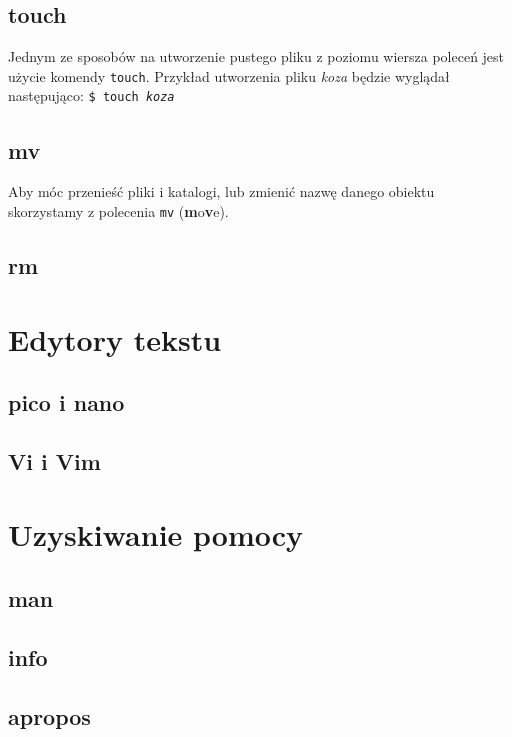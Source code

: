 \documentclass[10 pt, a4paper, draft]{article}
\begin{document}
\subsection{touch}
Jednym ze sposobów na utworzenie pustego pliku z poziomu wiersza poleceń jest użycie komendy \texttt{touch}. Przykład utworzenia pliku \textit{koza} będzie wyglądał następująco:
\newline
\texttt{\$ touch \textit{koza}}

\subsection{mv}
Aby móc przenieść pliki i katalogi, lub zmienić nazwę danego obiektu skorzystamy z polecenia \texttt{mv} (\textbf{m}o\textbf{v}e).

\subsection{rm}

\newpage
\section{Edytory tekstu}
\subsection{pico i nano}
\subsection{Vi i Vim}

\newpage
\section{Uzyskiwanie pomocy}
\subsection{man}
\subsection{info}
\subsection{apropos}
\end{document}
